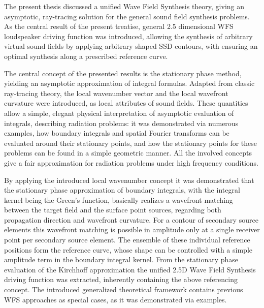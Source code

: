 The present thesis discussed a unified Wave Field Synthesis theory, giving an asymptotic, ray-tracing solution for the general sound field synthesis problems.
As the central result of the present treatise, general 2.5 dimensional WFS loudspeaker driving function was introduced, allowing the synthesis of arbitrary virtual sound fields by applying arbitrary shaped SSD contours, with ensuring an optimal synthesis along a prescribed reference curve.

The central concept of the presented results is the stationary phase method, yielding an asymptotic approximation of integral formulas.
Adapted from classic ray-tracing theory, the local wavenumber vector and the local wavefront curvature were introduced, as local attributes of sound fields.
These quantities allow a simple, elegant physical interpretation of asymptotic evaluation of integrals, describing radiation problems: it was demonstrated via numerous examples, how boundary integrals and spatial Fourier transforms can be evaluated around their stationary points, and how the stationary points for these problems can be found in a simple geometric manner.
All the involved concepts give a fair approximation for radiation problems under high frequency conditions.

By applying the introduced local wavenumber concept it was demonstrated that the stationary phase approximation of boundary integrals, with the integral kernel being the Green's function, basically realizes a wavefront matching between the target field and the surface point sources, regarding both propagation direction and wavefront curvature.
For a contour of secondary source elements this wavefront matching is possible in amplitude only at a single receiver point per secondary source element.
The ensemble of these individual reference positions form the reference curve, whose shape can be controlled with a simple amplitude term in the boundary integral kernel.
From the stationary phase evaluation of the Kirchhoff approximation the unified 2.5D Wave Field Synthesis driving function was extracted, inherently containing the above referencing concept.
The introduced generalized theoretical framework contains previous WFS approaches as special cases, as it was demonstrated via examples.

